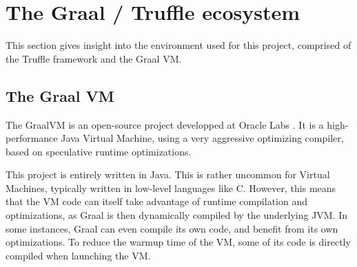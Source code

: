 \documentclass[twoside,11pt,a4paper]{article}
\newcommand{\startsection}[1]{
	\cleardoublepage
	\section{#1}
	\thispagestyle{basic}
}
\begin{document}
\startsection{The Graal / Truffle ecosystem}

This section gives insight into the environment used for this project, comprised of the Truffle framework and the Graal VM.

\subsection{The Graal VM}



The GraalVM is an open-source project developped at Oracle Labs \cite{graalpage}. It is a high-performance Java Virtual Machine, using a very aggressive optimizing compiler, based on speculative runtime optimizations.


This project is entirely written in Java. This is rather uncommon for Virtual Machines, typically written in low-level languages like C. However, this means that the VM code can itself take advantage of runtime compilation and optimizations, as Graal is then dynamically compiled by the underlying JVM. In some instances, Graal can even compile its own code, and benefit from its own optimizations. To reduce the warmup time of the VM, some of its code is directly compiled when launching the VM.

\end{document}
